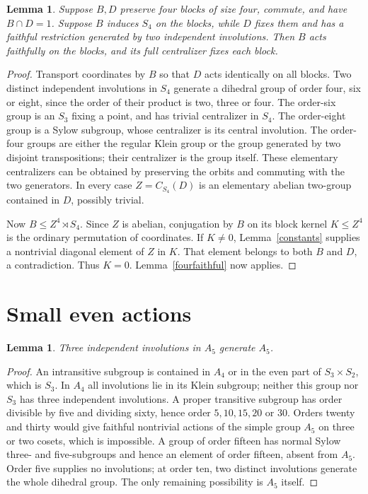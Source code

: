 \documentclass[11pt,a4paper]{article}
\newtheorem{lemma}[theorem]{Lemma}
\begin{document}
\begin{lemma}\label{fourkernel}
Suppose $B,D$ preserve four blocks of size four, commute, and have
$B\cap D=1$. Suppose $B$ induces $S_4$ on the blocks, while $D$ fixes
them and has a faithful restriction generated by two independent
involutions. Then $B$ acts faithfully on the blocks, and its full
centralizer fixes each block.
\end{lemma}
\begin{proof}
Transport coordinates by $B$ so that $D$ acts identically on all blocks.
Two distinct independent involutions in $S_4$ generate a dihedral group
of order four, six or eight, since the order of their product is two,
three or four. The order-six group is an $S_3$ fixing a point, and has
trivial centralizer in $S_4$. The order-eight group is a Sylow subgroup,
whose centralizer is its central involution. The order-four groups are
either the regular Klein group or the group generated by two disjoint
transpositions; their centralizer is the group itself. These elementary
centralizers can be obtained by preserving the orbits and commuting with
the two generators. In every case $Z=C_{S_4}(D)$ is an elementary
abelian two-group contained in $D$, possibly trivial.

Now $B\le Z^4\rtimes S_4$. Since $Z$ is abelian, conjugation by $B$
on its block kernel $K\le Z^4$ is the ordinary permutation of coordinates.
If $K\ne0$, Lemma~\ref{constants} supplies a nontrivial diagonal
element of $Z$ in $K$. That element belongs to both $B$ and $D$, a
contradiction. Thus $K=0$. Lemma~\ref{fourfaithful} now applies.
\end{proof}

\section{Small even actions}
\begin{lemma}\label{five}
Three independent involutions in $A_5$ generate $A_5$.
\end{lemma}
\begin{proof}
An intransitive subgroup is contained in $A_4$ or in the even part of
$S_3\times S_2$, which is $S_3$. In $A_4$ all involutions lie in its
Klein subgroup; neither this group nor $S_3$ has three independent
involutions. A proper transitive subgroup has order divisible by five
and dividing sixty, hence order $5,10,15,20$ or $30$. Orders twenty
and thirty would give faithful nontrivial actions of the simple group
$A_5$ on three or two cosets, which is impossible. A group of order
fifteen has normal Sylow three- and five-subgroups and hence an element
of order fifteen, absent from $A_5$. Order five supplies no involutions;
at order ten, two distinct involutions generate the whole dihedral group.
The only remaining possibility is $A_5$ itself.
\end{proof}
\end{document}
